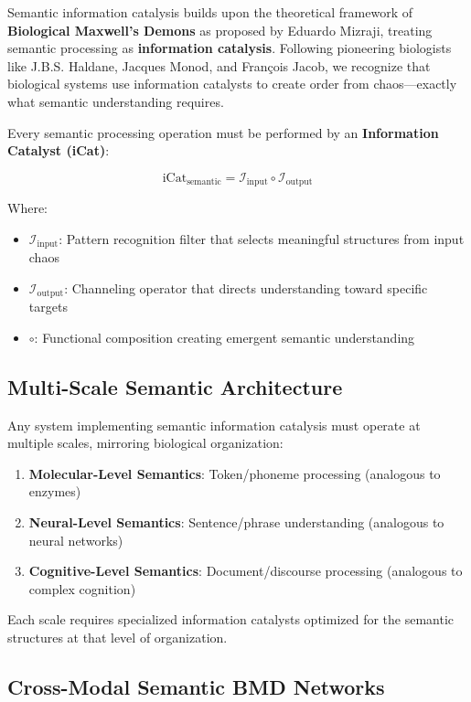 \documentclass[12pt,a4paper,twoside]{article}
\begin{document}
Semantic information catalysis builds upon the theoretical framework of \textbf{Biological Maxwell's Demons} as proposed by Eduardo Mizraji, treating semantic processing as \textbf{information catalysis}. Following pioneering biologists like J.B.S. Haldane, Jacques Monod, and François Jacob, we recognize that biological systems use information catalysts to create order from chaos—exactly what semantic understanding requires.

Every semantic processing operation must be performed by an \textbf{Information Catalyst (iCat)}:

\begin{equation}
\text{iCat}_{\text{semantic}} = \mathcal{I}_{\text{input}} \circ \mathcal{I}_{\text{output}}
\end{equation}

Where:
\begin{itemize}
\item $\mathcal{I}_{\text{input}}$: Pattern recognition filter that selects meaningful structures from input chaos
\item $\mathcal{I}_{\text{output}}$: Channeling operator that directs understanding toward specific targets
\item $\circ$: Functional composition creating emergent semantic understanding
\end{itemize}

\subsection{Multi-Scale Semantic Architecture}

Any system implementing semantic information catalysis must operate at multiple scales, mirroring biological organization:

\begin{enumerate}
\item \textbf{Molecular-Level Semantics}: Token/phoneme processing (analogous to enzymes)
\item \textbf{Neural-Level Semantics}: Sentence/phrase understanding (analogous to neural networks)
\item \textbf{Cognitive-Level Semantics}: Document/discourse processing (analogous to complex cognition)
\end{enumerate}

Each scale requires specialized information catalysts optimized for the semantic structures at that level of organization.

\subsection{Cross-Modal Semantic BMD Networks}
\end{document}
